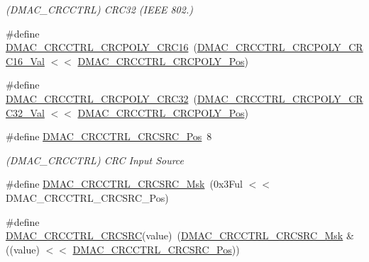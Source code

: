 \begin{DoxyCompactItemize}
\begin{DoxyCompactList}\small\item\em (D\+M\+A\+C\+\_\+\+C\+R\+C\+C\+T\+RL) C\+R\+C32 (I\+E\+EE 802.) \end{DoxyCompactList}\item 
\#define \mbox{\hyperlink{group___s_a_m_d21___d_m_a_c_ga471087616e9f20ccadbf347424f80de0}{D\+M\+A\+C\+\_\+\+C\+R\+C\+C\+T\+R\+L\+\_\+\+C\+R\+C\+P\+O\+L\+Y\+\_\+\+C\+R\+C16}}~(\mbox{\hyperlink{group___s_a_m_d21___d_m_a_c_gab7a571f0737b3094278178b68b70b75f}{D\+M\+A\+C\+\_\+\+C\+R\+C\+C\+T\+R\+L\+\_\+\+C\+R\+C\+P\+O\+L\+Y\+\_\+\+C\+R\+C16\+\_\+\+Val}} $<$$<$ \mbox{\hyperlink{group___s_a_m_d21___d_m_a_c_ga97c64ee6ae79fa28bef8e734380d31ee}{D\+M\+A\+C\+\_\+\+C\+R\+C\+C\+T\+R\+L\+\_\+\+C\+R\+C\+P\+O\+L\+Y\+\_\+\+Pos}})
\item 
\#define \mbox{\hyperlink{group___s_a_m_d21___d_m_a_c_gaa69d1bd9b5d9651b468708185004b1fa}{D\+M\+A\+C\+\_\+\+C\+R\+C\+C\+T\+R\+L\+\_\+\+C\+R\+C\+P\+O\+L\+Y\+\_\+\+C\+R\+C32}}~(\mbox{\hyperlink{group___s_a_m_d21___d_m_a_c_ga227b0d7a03589588e6f3234fba814b5a}{D\+M\+A\+C\+\_\+\+C\+R\+C\+C\+T\+R\+L\+\_\+\+C\+R\+C\+P\+O\+L\+Y\+\_\+\+C\+R\+C32\+\_\+\+Val}} $<$$<$ \mbox{\hyperlink{group___s_a_m_d21___d_m_a_c_ga97c64ee6ae79fa28bef8e734380d31ee}{D\+M\+A\+C\+\_\+\+C\+R\+C\+C\+T\+R\+L\+\_\+\+C\+R\+C\+P\+O\+L\+Y\+\_\+\+Pos}})
\item 
\#define \mbox{\hyperlink{group___s_a_m_d21___d_m_a_c_gadc538250fa40a515d90fc7bbde4c5f83}{D\+M\+A\+C\+\_\+\+C\+R\+C\+C\+T\+R\+L\+\_\+\+C\+R\+C\+S\+R\+C\+\_\+\+Pos}}~8
\begin{DoxyCompactList}\small\item\em (D\+M\+A\+C\+\_\+\+C\+R\+C\+C\+T\+RL) C\+RC Input Source \end{DoxyCompactList}\item 
\#define \mbox{\hyperlink{group___s_a_m_d21___d_m_a_c_ga591cb2c9938ec947f4e8df095b8f7c75}{D\+M\+A\+C\+\_\+\+C\+R\+C\+C\+T\+R\+L\+\_\+\+C\+R\+C\+S\+R\+C\+\_\+\+Msk}}~(0x3\+Ful $<$$<$ D\+M\+A\+C\+\_\+\+C\+R\+C\+C\+T\+R\+L\+\_\+\+C\+R\+C\+S\+R\+C\+\_\+\+Pos)
\item 
\#define \mbox{\hyperlink{group___s_a_m_d21___d_m_a_c_ga9f47a6ccfb40d4cae0bc14ff788b3537}{D\+M\+A\+C\+\_\+\+C\+R\+C\+C\+T\+R\+L\+\_\+\+C\+R\+C\+S\+RC}}(value)~(\mbox{\hyperlink{group___s_a_m_d21___d_m_a_c_ga591cb2c9938ec947f4e8df095b8f7c75}{D\+M\+A\+C\+\_\+\+C\+R\+C\+C\+T\+R\+L\+\_\+\+C\+R\+C\+S\+R\+C\+\_\+\+Msk}} \& ((value) $<$$<$ \mbox{\hyperlink{group___s_a_m_d21___d_m_a_c_gadc538250fa40a515d90fc7bbde4c5f83}{D\+M\+A\+C\+\_\+\+C\+R\+C\+C\+T\+R\+L\+\_\+\+C\+R\+C\+S\+R\+C\+\_\+\+Pos}}))

\end{DoxyCompactItemize}
